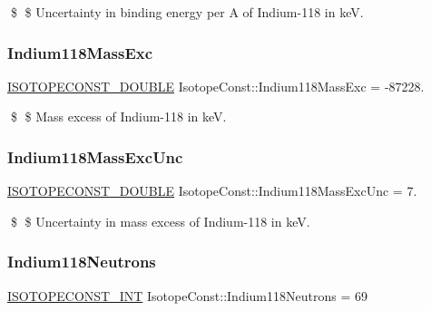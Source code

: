 \$ \$ Uncertainty in binding energy per A of Indium-\/118 in keV. \mbox{\label{group___isotope_const-_indium-_in118_ga41b192e8590cb1eac837bfa9704d9063}} 
\subsubsection{\texorpdfstring{Indium118\+Mass\+Exc}{Indium118MassExc}}
{\footnotesize\ttfamily \mbox{\hyperlink{group___isotope_const-_macros_ga8f45a7272ce02c0b4c65c44636ed719a}{I\+S\+O\+T\+O\+P\+E\+C\+O\+N\+S\+T\+\_\+\+D\+O\+U\+B\+LE}} Isotope\+Const\+::\+Indium118\+Mass\+Exc = -\/87228.}

\$ \$ Mass excess of Indium-\/118 in keV. \mbox{\label{group___isotope_const-_indium-_in118_ga18e5c06d72506353e2d0c83fcf79851d}} 
\subsubsection{\texorpdfstring{Indium118\+Mass\+Exc\+Unc}{Indium118MassExcUnc}}
{\footnotesize\ttfamily \mbox{\hyperlink{group___isotope_const-_macros_ga8f45a7272ce02c0b4c65c44636ed719a}{I\+S\+O\+T\+O\+P\+E\+C\+O\+N\+S\+T\+\_\+\+D\+O\+U\+B\+LE}} Isotope\+Const\+::\+Indium118\+Mass\+Exc\+Unc = 7.}

\$ \$ Uncertainty in mass excess of Indium-\/118 in keV. \mbox{\label{group___isotope_const-_indium-_in118_ga94f26c75f6f9183bd79395944d2e57f3}} 
\subsubsection{\texorpdfstring{Indium118\+Neutrons}{Indium118Neutrons}}
{\footnotesize\ttfamily \mbox{\hyperlink{group___isotope_const-_macros_ga5f18360b3e99483a35c32d789e62621c}{I\+S\+O\+T\+O\+P\+E\+C\+O\+N\+S\+T\+\_\+\+I\+NT}} Isotope\+Const\+::\+Indium118\+Neutrons = 69}

